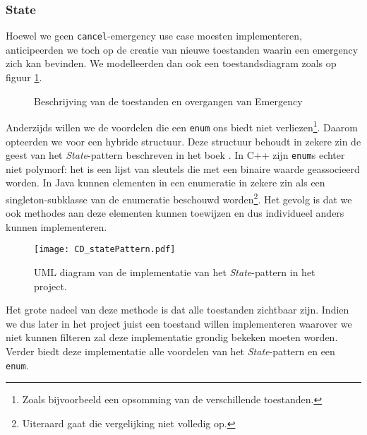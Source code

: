 \subsubsection{State}
Hoewel we geen \verb+cancel+-emergency use case moesten implementeren, anticipeerden we toch op de creatie van nieuwe toestanden waarin een emergency zich kan bevinden. We modelleerden dan ook een toestandsdiagram zoals op figuur \ref{fig:stateDiagramEmergency}.
\begin{figure}[h!]
\centering
{}
\caption{Beschrijving van de toestanden en overgangen van Emergency}
\label{fig:stateDiagramEmergency}
\end{figure}
Anderzijds willen we de voordelen die een \verb+enum+ ons biedt niet verliezen\footnote{Zoals bijvoorbeeld een opsomming van de verschillende toestanden.}. Daarom opteerden we voor een hybride structuur. Deze structuur behoudt in zekere zin de geest van het \textit{State}-pattern beschreven in het boek \cite{book:designpatterns}. In C++ zijn \verb+enum+s echter niet polymorf: het is een lijst van sleutels die met een binaire waarde geassocieerd worden. In Java kunnen elementen in een enumeratie in zekere zin als een singleton-subklasse van de enumeratie beschouwd worden\footnote{Uiteraard gaat die vergelijking niet volledig op.}. Het gevolg is dat we ook methodes aan deze elementen kunnen toewijzen en dus individueel anders kunnen implementeren.
\begin{figure}[h!]
\texttt{[image: CD\_statePattern.pdf]}
\caption{UML diagram van de implementatie van het \textit{State}-pattern in het project.}
\label{fig:statePattern}
\end{figure}
Het grote nadeel van deze methode is dat alle toestanden zichtbaar zijn. Indien we dus later in het project juist een toestand willen implementeren waarover we niet kunnen filteren zal deze implementatie grondig bekeken moeten worden. Verder biedt deze implementatie alle voordelen van het \textit{State}-pattern en een \verb+enum+.
